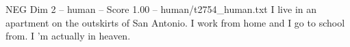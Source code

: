 \begin{textsample}{NEG Dim 2 – human – Score 1.00 – human/t2754\_human.txt}  \label{ex:f2_neg_022}
I live in an apartment on the outskirts of San Antonio.
I work from home and I go to school from.
I 'm actually in heaven.

\end{textsample}
